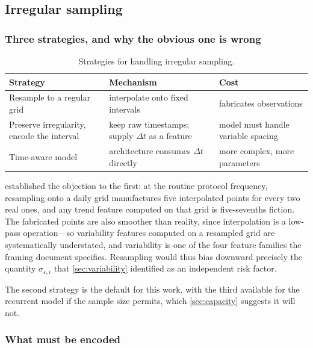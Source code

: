 \documentclass[12pt,a4paper,oneside]{report}
\begin{document}
\subsection{Irregular sampling}\label{sec:irregular}

\subsubsection{Three strategies, and why the obvious one is wrong}

\begin{table}[htbp]
\centering\small
\caption{Strategies for handling irregular sampling.}\label{tab:irregular-strategies}
\begin{tabularx}{\textwidth}{@{}>{\raggedright\arraybackslash}p{4.2cm} X >{\raggedright\arraybackslash}p{4.2cm}@{}}
\toprule
\textbf{Strategy} & \textbf{Mechanism} & \textbf{Cost} \\
\midrule
Resample to a regular grid & interpolate onto fixed intervals & fabricates observations \\
Preserve irregularity, encode the interval & keep raw timestamps; supply $\Delta t$ as a feature & model must handle variable spacing \\
Time-aware model & architecture consumes $\Delta t$ directly & more complex, more parameters \\
\bottomrule
\end{tabularx}
\end{table}

 established the objection to the first: at the routine protocol frequency, resampling onto a daily grid manufactures five interpolated points for every two real ones, and any trend feature computed on that grid is five-sevenths fiction. The fabricated points are also smoother than reality, since interpolation is a low-pass operation---so variability features computed on a resampled grid are systematically understated, and variability is one of the four feature families the framing document specifies. Resampling would thus bias downward precisely the quantity $\sigma_{\varepsilon,i}$ that \cref{sec:variability} identified as an independent risk factor.

The second strategy is the default for this work, with the third available for the recurrent model if the sample size permits, which \cref{sec:capacity} suggests it will not.

\subsubsection{What must be encoded}\label{sec:interval-features}
\end{document}
